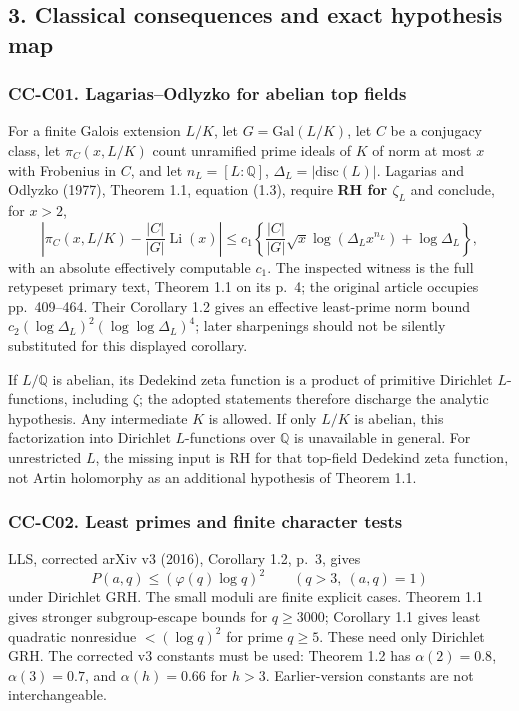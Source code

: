 \subsection{3. Classical consequences and exact hypothesis
map}\label{classical-consequences-and-exact-hypothesis-map}

\subsubsection{CC-C01. Lagarias--Odlyzko for abelian top
fields}\label{cc-c01.-lagariasodlyzko-for-abelian-top-fields}

For a finite Galois extension \(L/K\), let \(G=\mathrm{Gal}(L/K)\), let
\(C\) be a conjugacy class, let \(\pi_C(x,L/K)\) count unramified prime
ideals of \(K\) of norm at most \(x\) with Frobenius in \(C\), and let
\(n_L=[L:\mathbb Q]\), \(\Delta_L=|\mathrm{disc}(L)|\). Lagarias and
Odlyzko (1977), Theorem 1.1, equation (1.3), require \textbf{RH for
\(\zeta_L\)} and conclude, for \(x>2\), \[
 \left|\pi_C(x,L/K)-\frac{|C|}{|G|}\operatorname{Li}(x)\right|
 \le c_1\left\{\frac{|C|}{|G|}\sqrt{x}\log(\Delta_Lx^{n_L})+\log\Delta_L\right\},
\] with an absolute effectively computable \(c_1\). The inspected
witness is the full retypeset primary text, Theorem 1.1 on its p.~4; the
original article occupies pp.~409--464. Their Corollary 1.2 gives an
effective least-prime norm bound
\(c_2(\log\Delta_L)^2(\log\log\Delta_L)^4\); later sharpenings should
not be silently substituted for this displayed corollary.

If \(L/\mathbb Q\) is abelian, its Dedekind zeta function is a product
of primitive Dirichlet \(L\)-functions, including \(\zeta\); the adopted
statements therefore discharge the analytic hypothesis. Any intermediate
\(K\) is allowed. If only \(L/K\) is abelian, this factorization into
Dirichlet \(L\)-functions over \(\mathbb Q\) is unavailable in general.
For unrestricted \(L\), the missing input is RH for that top-field
Dedekind zeta function, not Artin holomorphy as an additional hypothesis
of Theorem 1.1.

\subsubsection{CC-C02. Least primes and finite character
tests}\label{cc-c02.-least-primes-and-finite-character-tests}

LLS, corrected arXiv v3 (2016), Corollary 1.2, p.~3, gives \[
 P(a,q)\le (\varphi(q)\log q)^2\qquad(q>3,\ (a,q)=1)
\] under Dirichlet GRH. The small moduli are finite explicit cases.
Theorem 1.1 gives stronger subgroup-escape bounds for \(q\ge3000\);
Corollary 1.1 gives least quadratic nonresidue \(<(\log q)^2\) for prime
\(q\ge5\). These need only Dirichlet GRH. The corrected v3 constants
must be used: Theorem 1.2 has \(\alpha(2)=0.8\), \(\alpha(3)=0.7\), and
\(\alpha(h)=0.66\) for \(h>3\). Earlier-version constants are not
interchangeable.

